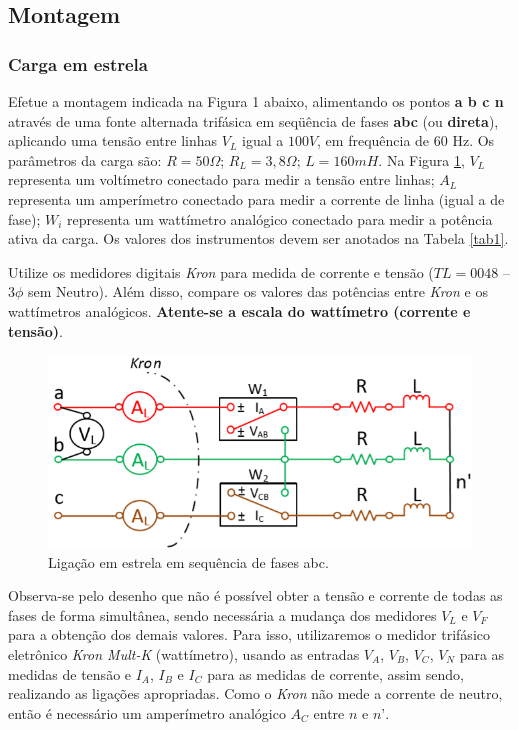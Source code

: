 \documentclass[a4paper,12pt,oneside,openany,table,xcdraw]{article}
\begin{document}
\subsection{Montagem} %

\subsubsection{Carga em estrela}
 Efetue a montagem indicada na Figura 1 abaixo, alimentando os pontos \textbf{a b c n} através de uma fonte alternada trifásica em seqüência de fases \textbf{abc} (ou \textbf{direta}), aplicando uma tensão entre linhas $V_L$ igual a $100 V$, em frequência de 60 Hz. Os parâmetros da carga são: $R = 50 \Omega$; $R_L = 3,8\Omega$; $L = 160 mH$. Na Figura \ref{fig1}, $V_L$ representa um voltímetro conectado para medir a tensão entre linhas; $A_L$ representa um amperímetro conectado para medir a corrente de linha (igual a de fase); $W_i$ representa um wattímetro analógico conectado para medir a potência ativa da carga. Os valores dos instrumentos devem ser anotados na Tabela \ref{tab1}.  

Utilize os medidores digitais \emph{Kron} para medida de corrente e tensão ($TL = 0048$ – $3\phi$ sem Neutro). Além disso, compare os valores das potências entre \emph{Kron} e os wattímetros analógicos. \textbf{Atente-se a escala do wattímetro (corrente e tensão)}. 
\begin{figure}[H]
\centering
\includegraphics[width=14cm]{fig1}
\caption{Ligação em estrela em sequência de fases abc.}
\label{fig1}
\end{figure}
Observa-se pelo desenho que não é possível obter a tensão e corrente de todas as fases de forma simultânea, sendo necessária a mudança dos medidores $V_L$ e $V_F$ para a obtenção dos demais valores. Para isso, utilizaremos o medidor trifásico eletrônico \textit{Kron Mult-K} (wattímetro),  usando as entradas $V_A$, $V_B$, $V_C$, $V_N$ para as medidas de tensão e $I_A$, $I_B$ e $I_C$ para as medidas de corrente, assim sendo, realizando as ligações apropriadas. Como o \textit{Kron} não mede a corrente de neutro, então é necessário um amperímetro analógico $A_C$ entre $n$ e $n’$.
\end{document}
